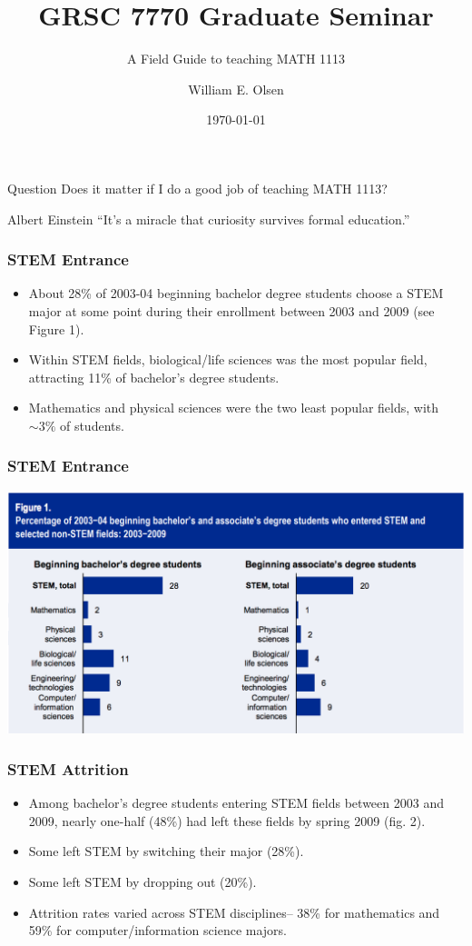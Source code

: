 \documentclass{beamer}
\title{GRSC 7770 Graduate Seminar}
\subtitle{A Field Guide to teaching MATH 1113}
\author{William E. Olsen}
\date{\today}
\begin{document}
\frame{\titlepage}

\begin{frame}
  \begin{block}{Question}
    Does it matter if I do a good job of teaching MATH 1113?
  \end{block}
\end{frame}

\begin{frame}
  \begin{block}{Albert Einstein}
    ``It's a miracle that curiosity survives formal education.''
  \end{block}
  
\end{frame}

\begin{frame}
  \frametitle{STEM Entrance}
  \begin{itemize}
  \item  About 28\% of 2003-04 beginning bachelor degree students choose a STEM major at some point during their enrollment between 2003 and 2009 (see Figure 1).
  \item Within STEM fields, biological/life sciences was the most popular field, attracting 11\% of bachelor's degree students.
  \item Mathematics and physical sciences were the two least popular fields, with $\sim 3\%$ of students. 
  \end{itemize}
\end{frame}

\begin{frame}
  \frametitle{STEM Entrance}
  \includegraphics[scale = 0.34]{fig1.png}
\end{frame}

\begin{frame}
  \frametitle{STEM Attrition}
  \begin{itemize}
  \item Among bachelor's degree students entering STEM fields between 2003 and 2009, nearly one-half (48\%) had left these fields by spring 2009 (fig. 2).
  \item Some left STEM by switching their major (28\%).
  \item Some left STEM by dropping out (20\%).
  \item Attrition rates varied across STEM disciplines-- 38\% for mathematics and 59\% for computer/information science majors.
  \end{itemize} 
\end{frame}
\end{document}
